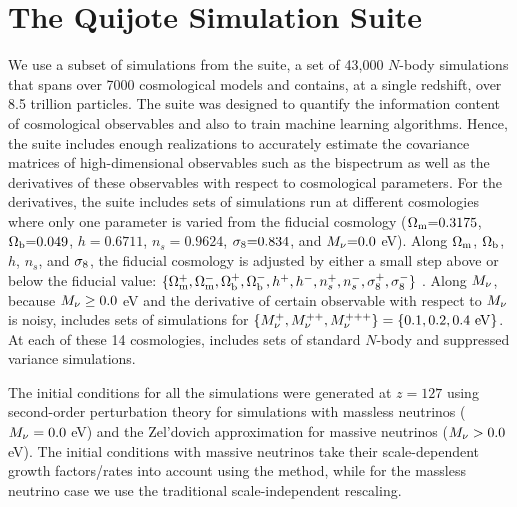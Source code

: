 \section{The Quijote Simulation Suite} \label{sec:sims}
We use a subset of simulations from the \quij suite, a set of 43,000 $N$-body 
simulations that spans over 7000 cosmological models and contains, at a single 
redshift, over 8.5 trillion particles. The \quij suite was designed to quantify
the information content of cosmological observables and also to train machine 
learning algorithms. Hence, the suite includes enough realizations to accurately 
estimate the covariance matrices of high-dimensional observables such as the 
bispectrum as well as the derivatives of these observables with respect to 
cosmological parameters. For the derivatives, the suite includes sets of 
simulations run at different cosmologies where only one parameter is varied 
from the fiducial cosmology  
($\Omega_{\rm m}{=}0.3175$, $\Omega_{\rm b}{=}0.049$, $h{=}0.6711$, $n_s{=}0.9624$, $\sigma_8{=}0.834$, 
and $M_\nu{=}0.0$ eV). Along $\Omega_{\rm m}$, $\Omega_{\rm b}$, $h$, $n_s$, and $\sigma_8$, the fiducial 
cosmology is adjusted by either a small step above or below the fiducial value:
$\{\Omega_{\rm m}^{+}, \Omega_{\rm m}^{-}, \Omega_{\rm b}^{+}, \Omega_{\rm b}^{-}, h^+, h^-, n_s^{+}, n_s^{-}, \sigma_8^{+}, \sigma_8^-\}$ . 
Along $M_\nu$, because $M_\nu \ge 0.0$ eV and the derivative of certain observable 
with respect to $M_\nu$ is noisy, \quij includes sets of simulations for 
$\{M_\nu^{+}, M_\nu^{++}, M_\nu^{+++} \} = \{0.1, 0.2, 0.4~{\rm eV}\}$.
At each of these 14 cosmologies, \quij includes sets of standard $N$-body and 
suppressed variance simulations. 

The initial conditions for all the simulations were generated at $z=127$ using 
second-order perturbation theory for simulations with massless neutrinos 
($M_\nu = 0.0$ eV) and the Zel’dovich approximation for massive neutrinos 
($M_\nu > 0.0$ eV). The initial conditions with massive neutrinos take 
their scale-dependent growth factors/rates into account using the 
\cite{zennaro2017a} method, while for the massless neutrino case we use 
the traditional scale-independent rescaling. 


